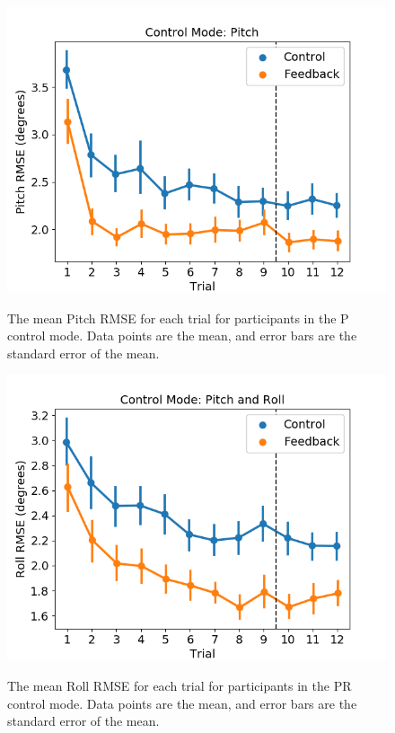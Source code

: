 \begin{figure}[tbp]
    \begin{center}
        \includegraphics[width=0.8\linewidth]{figures/Aircraft/image3.png}
        \caption[The mean Pitch RMSE for each trial]{The mean Pitch RMSE for each trial for participants in the P control mode. Data points are the mean, and error bars are the standard error of the mean.}
        \label{figure-hfes:pitchrmse}
% 
        \includegraphics[width=0.8\linewidth]{figures/Aircraft/image4.png}
        \caption[The mean Roll RMSE for each trial]{The mean Roll RMSE for each trial for participants in the PR control mode. Data points are the mean, and error bars are the standard error of the mean.}
        \label{figure-hfes:rollrmse}
    \end{center}
\end{figure}

